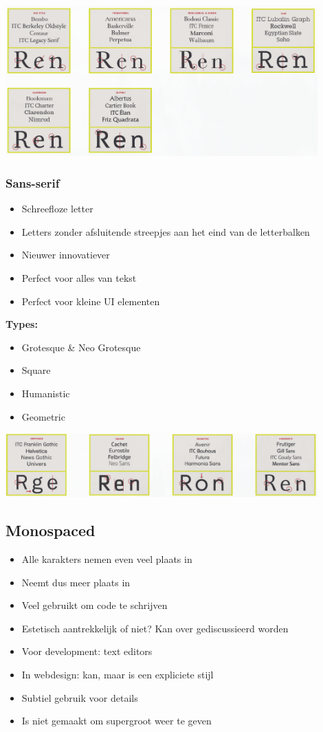 \documentclass{article}
\newcommand{\bold}[1]{\textbf{#1}}
\begin{document}
\includegraphics[width=0.9\textwidth]{img/Screenshot_20200224_084930.png}

\subsubsection{Sans-serif}
\begin{itemize}
    \item Schreefloze letter
    \item Letters zonder afsluitende streepjes aan het eind van de letterbalken
    \item Nieuwer innovatiever
    \item Perfect voor alles van tekst
    \item Perfect voor kleine UI elementen
\end{itemize}

\bold{Types:}
\begin{itemize}
    \item Grotesque \& Neo Grotesque
    \item Square
    \item Humanistic
    \item Geometric
\end{itemize}

\includegraphics[width=0.9\textwidth]{img/Screenshot_20200224_085146.png}

\subsection{Monospaced}
\begin{itemize}
    \item Alle karakters nemen even veel plaats in
    \item Neemt dus meer plaats in 
    \item Veel gebruikt om code te schrijven
    \item Estetisch aantrekkelijk of niet? Kan over gediscussieerd worden
    \item Voor development: text editors
    \item In webdesign: kan, maar is een expliciete stijl
    \item Subtiel gebruik voor details
    \item Is niet gemaakt om supergroot weer te geven
\end{itemize}
\newpage
\end{document}
